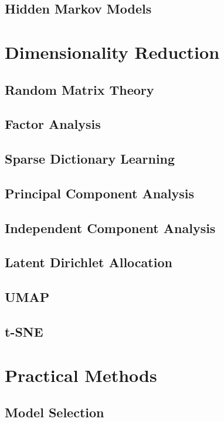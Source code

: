 \documentclass{article}
\begin{document}
  \subsection{Hidden Markov Models}

\section{Dimensionality Reduction} 

  \subsection{Random Matrix Theory} 

  \subsection{Factor Analysis}

  \subsection{Sparse Dictionary Learning}

  \subsection{Principal Component Analysis} 

  \subsection{Independent Component Analysis} 

  \subsection{Latent Dirichlet Allocation} 

  \subsection{UMAP}

  \subsection{t-SNE}

\section{Practical Methods} 

  \subsection{Model Selection} 
\end{document}
